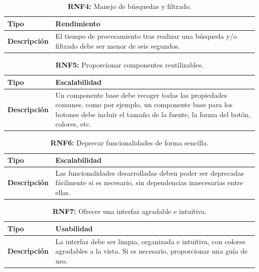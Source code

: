 \documentclass[a4paper, 12pt]{article}
\begin{document}
\begin{table}[H]
\captionsetup{list=no}%
\captionsetup{justification=raggedright,singlelinecheck=false}
\captionsetup{labelformat=empty}
\caption*{\textbf{RNF4:} Manejo de búsquedas y filtrado.}
\label{tab:RNF4}
    \begin{tabular}{|m{5cm}|m{10cm}|}
	    \hline
	    \textbf{Tipo} & Rendimiento \\ 
	    \hline
	    \textbf{Descripción} & El tiempo de procesamiento tras realizar una búsqueda y/o filtrado debe ser menor de seis segundos. \\ 
	    \hline
    \end{tabular}
\end{table}

\begin{table}[H]
\captionsetup{list=no}%
\captionsetup{justification=raggedright,singlelinecheck=false}
\captionsetup{labelformat=empty}
\caption*{\textbf{RNF5:} Proporcionar componentes reutilizables.}
\label{tab:RNF5}
    \begin{tabular}{|m{5cm}|m{10cm}|}
	    \hline
	    \textbf{Tipo} & Escalabilidad \\ 
	    \hline
	    \textbf{Descripción} & Un componente base debe recoger todas las propiedades comunes, como por ejemplo, un componente base para los botones debe incluir el tamaño de la fuente, la forma del botón, colores, etc. \\ 
	    \hline
    \end{tabular}
\end{table}

\begin{table}[H]
\captionsetup{list=no}%
\captionsetup{justification=raggedright,singlelinecheck=false}
\captionsetup{labelformat=empty}
\caption*{\textbf{RNF6:} Deprecar funcionalidades de forma sencilla.}
\label{tab:RNF6}
    \begin{tabular}{|m{5cm}|m{10cm}|}
	    \hline
	    \textbf{Tipo} & Escalabilidad \\ 
	    \hline
	    \textbf{Descripción} & Las funcionalidades desarrolladas deben poder ser deprecadas fácilmente si es necesario, sin dependencias innecesarias entre ellas. \\ 
	    \hline
    \end{tabular}
\end{table}

\begin{table}[H]
\captionsetup{list=no}%
\captionsetup{justification=raggedright,singlelinecheck=false}
\captionsetup{labelformat=empty}
\caption*{\textbf{RNF7:} Ofrecer una interfaz agradable e intuitiva. }
\label{tab:RNF7}
    \begin{tabular}{|m{5cm}|m{10cm}|}
	    \hline
	    \textbf{Tipo} & Usabilidad \\ 
	    \hline
	    \textbf{Descripción} & La interfaz debe ser limpia, organizada e intuitiva, con colores agradables a la vista. Si es necesario, proporcionar una guía de uso. \\ 
	    \hline
    \end{tabular}
\end{table}
\end{document}
